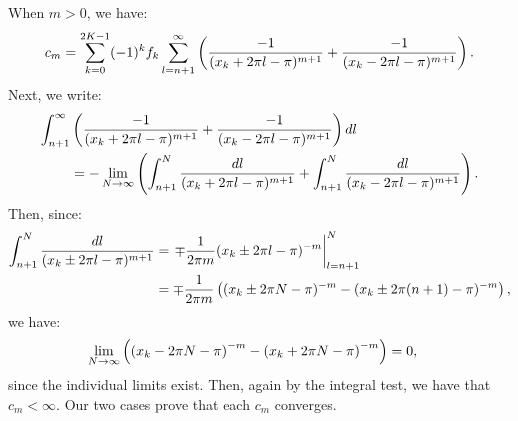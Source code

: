 When $m>0$, we have:
\begin{align*}
  c_m = \sum_{k=0}^{2K-1} (-1)^k f_k \sum_{l = n+1}^\infty \left(\frac{-1}{(x_k + 2\pi l - \pi)^{m+1}} + \frac{-1}{(x_k - 2\pi l - \pi)^{m+1}}\right).
\end{align*}
Next, we write:
\begin{align*}
  \int_{n+1}^\infty &\left(\frac{-1}{(x_k + 2\pi l - \pi)^{m+1}} + \frac{-1}{(x_k - 2\pi l - \pi)^{m+1}}\right) dl \\
  &= -\lim_{N \to \infty} \left(\int_{n+1}^N \frac{dl}{(x_k + 2\pi l - \pi)^{m+1}} + \int_{n+1}^N \frac{dl}{(x_k - 2\pi l - \pi)^{m+1}}\right).
\end{align*}
Then, since:
\begin{align*}
  \int_{n+1}^N \frac{dl}{(x_k \pm 2 \pi l - \pi)^{m+1}} &= \left. \mp \frac{1}{2 \pi m} (x_k \pm 2 \pi l - \pi)^{-m} \right|_{l=n+1}^N \\
  &= \mp \frac{1}{2\pi m} \left((x_k \pm 2 \pi N - \pi)^{-m} - (x_k \pm 2 \pi (n+1) - \pi)^{-m}\right),
\end{align*}
we have:
\begin{align*}
  \lim_{N\to\infty} \left(\left(x_k - 2\pi N - \pi\right)^{-m} - \left(x_k + 2\pi N - \pi\right)^{-m}\right) &= 0,
\end{align*}
since the individual limits exist. Then, again by the integral test,
we have that $c_m < \infty$. Our two cases prove that each $c_m$ converges.

